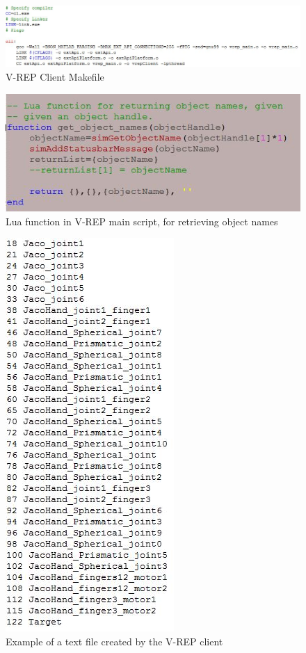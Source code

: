 \documentclass[12pt,openany,a4paper]{book}
\begin{document}
\begin{center}
\begin{figure}[htb]
  \includegraphics[width=1.1\linewidth]{makefile.jpg}
\caption{V-REP Client Makefile}
\end{figure}
\end{center}

\begin{center}
\begin{figure}[htb]
  \includegraphics[width=0.8\linewidth]{object_names.jpg}
\caption{Lua function in V-REP main script, for retrieving object names}
\end{figure}
\end{center}

\begin{center}
\begin{figure}[htb]
  \includegraphics[width=0.4\linewidth]{text_file_example.jpg}
\caption{Example of a text file created by the V-REP client}
\end{figure}
\end{center}
\end{document}
